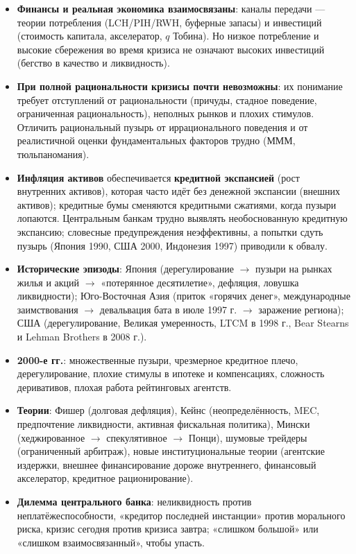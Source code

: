 \documentclass[10pt,a4paper]{article}
\begin{document}
\begin{itemize}[leftmargin=1.3em]
\item \textbf{Финансы и реальная экономика взаимосвязаны}: каналы передачи — теории потребления (LCH/PIH/RWH, буферные запасы) и инвестиций (стоимость капитала, акселератор, $q$ Тобина). Но низкое потребление и высокие сбережения во время кризиса не означают высоких инвестиций (бегство в качество и ликвидность).
\item \textbf{При полной рациональности кризисы почти невозможны}: их понимание требует отступлений от рациональности (причуды, стадное поведение, ограниченная рациональность), неполных рынков и плохих стимулов. Отличить рациональный пузырь от иррационального поведения и от реалистичной оценки фундаментальных факторов трудно (МММ, тюльпаномания).
\item \textbf{Инфляция активов} обеспечивается \textbf{кредитной экспансией} (рост внутренних активов), которая часто идёт без денежной экспансии (внешних активов); кредитные бумы сменяются кредитными сжатиями, когда пузыри лопаются. Центральным банкам трудно выявлять необоснованную кредитную экспансию; словесные предупреждения неэффективны, а попытки сдуть пузырь (Япония 1990, США 2000, Индонезия 1997) приводили к обвалу.
\item \textbf{Исторические эпизоды}: Япония (дерегулирование $\to$ пузыри на рынках жилья и акций $\to$ «потерянное десятилетие», дефляция, ловушка ликвидности); Юго-Восточная Азия (приток «горячих денег», международные заимствования $\to$ девальвация бата в июле 1997 г. $\to$ заражение региона); США (дерегулирование, Великая умеренность, LTCM в 1998 г., Bear Stearns и Lehman Brothers в 2008 г.).
\item \textbf{2000-е гг.}: множественные пузыри, чрезмерное кредитное плечо, дерегулирование, плохие стимулы в ипотеке и компенсациях, сложность деривативов, плохая работа рейтинговых агентств.
\item \textbf{Теории}: Фишер (долговая дефляция), Кейнс (неопределённость, MEC, предпочтение ликвидности, активная фискальная политика), Мински (хеджированное $\to$ спекулятивное $\to$ Понци), шумовые трейдеры (ограниченный арбитраж), новые институциональные теории (агентские издержки, внешнее финансирование дороже внутреннего, финансовый акселератор, кредитное рационирование).
\item \textbf{Дилемма центрального банка}: неликвидность против неплатёжеспособности, «кредитор последней инстанции» против морального риска, кризис сегодня против кризиса завтра; «слишком большой» или «слишком взаимосвязанный», чтобы упасть.
\end{itemize}
\end{document}
